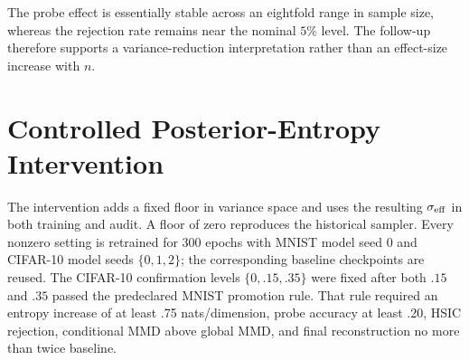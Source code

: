 The probe effect is essentially stable across an eightfold range in sample
size, whereas the rejection rate remains near the nominal $5\%$ level.  The
follow-up therefore supports a variance-reduction interpretation rather than
an effect-size increase with $n$.

\section{Controlled Posterior-Entropy Intervention}
\label{app:entropy-v9}

The intervention adds a fixed floor in variance space and uses the resulting
$\sigma_{\rm eff}$ in both training and audit.  A floor of zero reproduces the
historical sampler.  Every nonzero setting is retrained for 300 epochs with
MNIST model seed 0 and CIFAR-10 model seeds $\{0,1,2\}$; the corresponding
baseline checkpoints are reused.  The CIFAR-10 confirmation
levels $\{0,.15,.35\}$ were fixed after both $.15$ and $.35$ passed the
predeclared MNIST promotion rule.  That rule required an entropy increase of
at least .75 nats/dimension, probe accuracy at least .20, HSIC rejection,
conditional MMD above global MMD, and final reconstruction no more than twice
baseline.

\begin{table}[ht]
\caption{Complete MNIST entropy sweep.  Median standard deviation is the
effective posterior value; floor hit refers to the raw log-variance head.}
\label{tab:entropy-mnist-full-v9}
\centering
\scriptsize
\setlength{\tabcolsep}{3.2pt}
\end{table}

